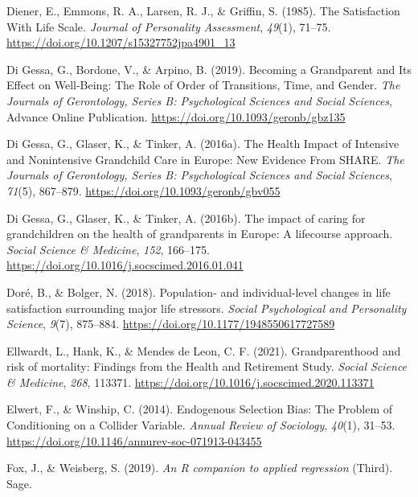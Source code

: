 \documentclass[
  english,
  man, noextraspace]{apa7}
\begin{document}
\leavevmode\hypertarget{ref-dienerSatisfactionLifeScale1985}{}%
Diener, E., Emmons, R. A., Larsen, R. J., \& Griffin, S. (1985). The Satisfaction With Life Scale. \emph{Journal of Personality Assessment}, \emph{49}(1), 71--75. \url{https://doi.org/10.1207/s15327752jpa4901_13}

\leavevmode\hypertarget{ref-digessaBecomingGrandparentIts2019}{}%
Di Gessa, G., Bordone, V., \& Arpino, B. (2019). Becoming a Grandparent and Its Effect on Well-Being: The Role of Order of Transitions, Time, and Gender. \emph{The Journals of Gerontology, Series B: Psychological Sciences and Social Sciences}, Advance Online Publication. \url{https://doi.org/10.1093/geronb/gbz135}

\leavevmode\hypertarget{ref-digessaHealthImpactIntensive2016}{}%
Di Gessa, G., Glaser, K., \& Tinker, A. (2016a). The Health Impact of Intensive and Nonintensive Grandchild Care in Europe: New Evidence From SHARE. \emph{The Journals of Gerontology, Series B: Psychological Sciences and Social Sciences}, \emph{71}(5), 867--879. \url{https://doi.org/10.1093/geronb/gbv055}

\leavevmode\hypertarget{ref-digessaImpactCaringGrandchildren2016}{}%
Di Gessa, G., Glaser, K., \& Tinker, A. (2016b). The impact of caring for grandchildren on the health of grandparents in Europe: A lifecourse approach. \emph{Social Science \& Medicine}, \emph{152}, 166--175. \url{https://doi.org/10.1016/j.socscimed.2016.01.041}

\leavevmode\hypertarget{ref-dorePopulationIndividuallevelChanges2018}{}%
Doré, B., \& Bolger, N. (2018). Population- and individual-level changes in life satisfaction surrounding major life stressors. \emph{Social Psychological and Personality Science}, \emph{9}(7), 875--884. \url{https://doi.org/10.1177/1948550617727589}

\leavevmode\hypertarget{ref-ellwardtGrandparenthoodRiskMortality2021}{}%
Ellwardt, L., Hank, K., \& Mendes de Leon, C. F. (2021). Grandparenthood and risk of mortality: Findings from the Health and Retirement Study. \emph{Social Science \& Medicine}, \emph{268}, 113371. \url{https://doi.org/10.1016/j.socscimed.2020.113371}

\leavevmode\hypertarget{ref-elwertEndogenousSelectionBias2014}{}%
Elwert, F., \& Winship, C. (2014). Endogenous Selection Bias: The Problem of Conditioning on a Collider Variable. \emph{Annual Review of Sociology}, \emph{40}(1), 31--53. \url{https://doi.org/10.1146/annurev-soc-071913-043455}

\leavevmode\hypertarget{ref-car2019}{}%
Fox, J., \& Weisberg, S. (2019). \emph{An R companion to applied regression} (Third). Sage.
\end{document}

